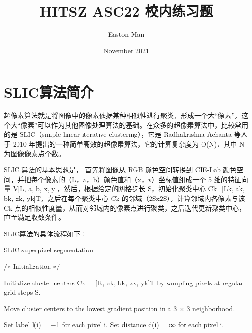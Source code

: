 \documentclass{ctexart}
\title{HITSZ ASC22 校内练习题}
\author{Easton Man}
\date{November 2021}
\begin{document}
\maketitle

\section{SLIC算法简介}
超像素算法就是将图像中的像素依据某种相似性进行聚类，形成一个大“像素”，这个大“像素”可以作为其他图像处理算法的基础。在众多的超像素算法中，比较常用的是 SLIC（simple linear iterative clustering），它是 Radhakrishna Achanta 等人于 2010 年提出的一种简单高效的超像素算法，它的计算复杂度为 O(N)，其中 N 为图像像素点个数。

SLIC 算法的基本思想是， 首先将图像从 RGB 颜色空间转换到 CIE-Lab 颜色空间，并把每个像素的（L，a，b）颜色值和（x，y）坐标值组成一个 5 维的特征向量 V[L, a, b, x, y]，然后，根据给定的网格步长 S，初始化聚类中心 Ck=[Lk, ak, bk, xk, yk]T，之后在每个聚类中心 Ck 的邻域（2Sx2S），计算邻域内各像素与该 Ck 点的相似性度量，从而对邻域内的像素点进行聚类，之后迭代更新聚类中心，直至满足收敛条件。

SLIC算法的具体流程如下：
\begin{algorithm}[H]
\caption{SLIC superpixel segmentation}
/∗ Initialization ∗/

Initialize cluster centers Ck = [lk, ak, bk, xk, yk]T by sampling pixels at regular grid steps S.

Move cluster centers to the lowest gradient position in a 3 × 3 neighborhood.

Set label l(i) = −1 for each pixel i. Set distance d(i) = ∞ for each pixel i.


\end{algorithm}
\end{document}
